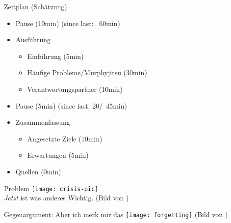 \begin{frame}{Zeitplan (Schätzung)}
\begin{itemize}
\begin{itemize}
            \end{itemize}
        \item Pause (10min) (since last: ~60min)
        \item Ausführung
            \begin{itemize}
                \item Einführung (5min)
                \item Häufige Probleme/Murphyjitsu (30min)
                \item Verantwortungspartner (10min)
            \end{itemize}
        \item Pause (5min) (since last: 20/~45min)
        \item Zusammenfassung
            \begin{itemize}
                \item Angesetzte Ziele (10min)
                \item Erwartungen (5min)
            \end{itemize}
        \item Quellen (0min)
    \end{itemize}
\end{frame}


\begin{frame}[c]{Problem}
    \texttt{[image: crisis-pic]} \\
    {\em Jetzt} ist was anderes Wichtig. (Bild von \cite{crisis-pic})
\end{frame}


\begin{frame}[c]{Gegenargument: Aber ich merk mir das}
    \pause
    \texttt{[image: forgetting]}
    (Bild von \cite{forgetting-pic})
\end{frame}


\backupend
